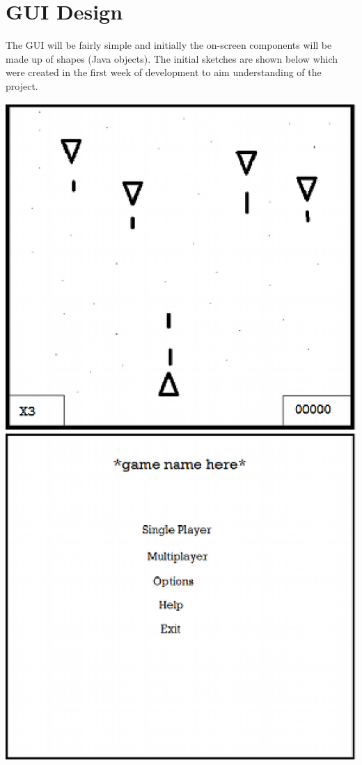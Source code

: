\section{GUI Design}
\label{sec: gui_design}
The GUI will be fairly simple and initially the on-screen components will be made up of shapes (Java objects). The initial sketches are shown below which were created in the first week of development to aim understanding of the project.\\
\begin{center}
\includegraphics{GUI1.eps}
\includegraphics{GUI2.eps}
\end{center}
